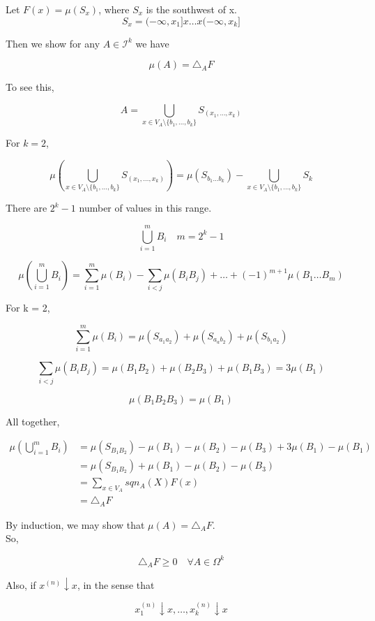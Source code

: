 \documentclass[11pt,fleqn]{book} %
\begin{document}
Let $F(x) = \mu(S_x)$, where $S_x$ is the southwest of x. \\

		$$S_x = (-\infty, x_1] x \dots x(-\infty, x_k]$$

Then we show for any $ A \in \mathcal{I}^k$ we have

		$$ \mu(A) = \triangle_A F$$

To see this, 

		$$ A = \bigcup_{x \in V_A \setminus \{b_1, \dots, b_k \}} S_{(x_1, \dots, x_k)}$$


For $k = 2$, 

		$$\mu(\bigcup_{x \in V_A \setminus \{b_1, \dots, b_k \}} S_{(x_1, \dots, x_k)} ) = \mu(S_{b_1\dots b_k}) - \bigcup_{x \in V_A \setminus \{b_1, \dots, b_k \}} S_k$$


There are $2^k - 1$ number of values in this range. 


		$$\bigcup_{i=1}^m  B_i \quad m = 2^k - 1$$

		$$\mu(\bigcup_{i=1}^m  B_i) = \sum^m_{i=1} \mu(B_i) - \sum_{i<j} \mu(B_i B_j) + \dots + (-1)^{m+1} \mu(B_1 \dots B_m) $$

For k = 2, 

		$$\sum^m_{i=1} \mu(B_i) = \mu(S_{a_1 a_2}) + \mu(S_{a_a b_2}) + \mu(S_{b_1 a_2}) $$

		$$\sum_{i<j} \mu(B_i B_j) = \mu(B_1 B_2) + \mu(B_2 B_3) + \mu(B_1 B_3) = 3 \mu(B_1) $$

		$$\mu(B_1 B_2 B_3) = \mu(B_1) $$

All together, 

		\begin{align*}
		 	\mu(\bigcup_{i=1}^m  B_i) &= \mu(S_{B_1 B_2}) - \mu(B_1) -\mu(B_2) - \mu(B_3) + 3 \mu(B_1) - \mu(B_1)\\
		 	  &= \mu(S_{B_1 B_2}) + \mu(B_1) -\mu(B_2) - \mu(B_3)\\
		 	  &= \sum_{x \in V_A} sqn_A (X) F(x)\\
		 	  &= \triangle_A F 
		 \end{align*} 



By induction, we may show that $\mu(A) = \triangle_A F$. \\


So, 	

		$$\triangle_A F \geq 0 \quad \forall A \in \Omega^k $$

Also, if $x^{(n)} \downarrow x$,  in the sense that

		$$x_1^{(n)}\downarrow x, \dots, x_k^{(n)} \downarrow x $$
\end{document}

